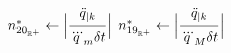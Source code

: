 \begin{figure}[!htbp]
\begin{minipage}{\textwidth}
\begin{algorithm}[H]
\begin{algorithmic}[1]
        \EndIf 
            {$n_{{20}_{\mathbb{R}^{+}}}^{*} \gets \abs[\Big]{\myfrac[5pt]{\ddot{q}_{|k}}{\dddot{q}_m \delta t}}$}%
\vspace{1.5mm}             
            {$n_{{19}_{\mathbb{R}^{+}}}^{*} \gets \abs[\Big]{\myfrac[5pt]{\ddot{q}_{|k}}{\dddot{q}_M \delta t}}$}%
        

\end{algorithmic}
\end{algorithm}
\end{minipage}
\end{figure}
